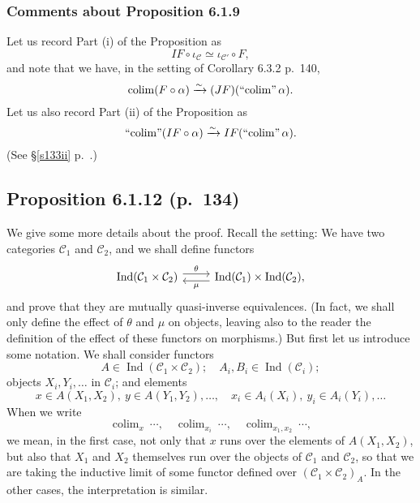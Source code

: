 \documentclass[12pt]{article}
\theoremstyle{remark}
\theoremstyle{definition}
\newcommand{\C}{\mathcal C}
\newcommand{\xr}{\xrightarrow}
\DeclareMathOperator*{\colim}{colim}
\DeclareMathOperator*{\ic}{``\!\colim\!"}
\DeclareMathOperator{\Ind}{Ind}
\begin{document}
\subsubsection{Comments about Proposition 6.1.9} 

Let us record Part (i) of the Proposition as 
%
\begin{equation}\label{133i}
IF\circ\iota_\C\simeq\iota_{\C'}\circ F, 
\end{equation} 
%
and note that we have, in the setting of Corollary 6.3.2 p.~140, 
%
\begin{equation}\label{140}
\colim(F\circ\alpha)\xr\sim(JF)(\ic\alpha).
\end{equation} 
%
Let us also record Part (ii) of the Proposition as 
% 
\begin{equation}\label{133ii}
\ic(IF\circ\alpha)\xr\sim IF(\ic\alpha).
\end{equation} 
% 
(See \S\ref{s133ii} p.~\pageref{s133ii}.)


\subsection{Proposition 6.1.12 (p.~134)}\label{6112}

We give some more details about the proof. Recall the setting: We have two categories $\C_1$ and $\C_2$, and we shall define functors
$$
\begin{tikzcd}
\Ind(\C_1\times\C_2)\ar[yshift=0.7ex]{r}{\theta}&\Ind(\C_1)\times\Ind(\C_2),\ar[yshift=-0.7ex]{l}{\mu}
\end{tikzcd}
$$ 
and prove that they are mutually quasi-inverse equivalences. (In fact, we shall only define the effect of $\theta$ and $\mu$ on objects, leaving also to the reader the definition of the effect of these functors on morphisms.) But first let us introduce some notation. We shall consider functors 
$$
A\in\Ind(\C_1\times\C_2);\quad A_i,B_i\in\Ind(\C_i);
$$ 
objects $X_i,Y_i,\dots$ in $\C_i$; and elements 
$$
x\in A(X_1,X_2),\ y\in A(Y_1,Y_2),\dots,\quad x_i\in A_i(X_i),\ y_i\in A_i(Y_i),\dots
$$ 
When we write 
$$
\colim_x\ \cdots,\quad\colim_{x_i}\ \cdots,\quad\colim_{x_1,x_2}\ \cdots,
$$ 
we mean, in the first case, not only that $x$ runs over the elements of $A(X_1,X_2)$, but also that $X_1$ and $X_2$ themselves run over the objects of $\C_1$ and $\C_2$, so that we are taking the inductive limit of some functor defined over $(\C_1\times\C_2)_A$. In the other cases, the interpretation is similar. 
\end{document}
